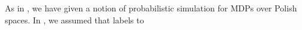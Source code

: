 \documentclass{ifacconf}
\renewcommand{\axx}[1]{{\color{orange} Ali: #1}}
\begin{document}
 \color{black}
%  
%
%

As in \citep{haesaert2017verification},  we have given a notion of probabilistic simulation for  MDPs over Polish spaces.  In  \citep{haesaert2017verification},  we assumed that labels to 
 
\end{document}
